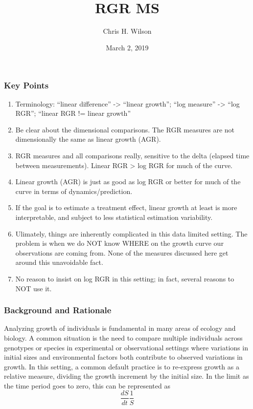 \documentclass[]{article}
\title{RGR MS}
\author{Chris H. Wilson}
\date{March 2, 2019}
\begin{document}
\maketitle

\subsubsection{Key Points}\label{key-points}

\begin{enumerate}
\def\labelenumi{\arabic{enumi})}
\item
  Terminology: ``linear difference'' -\textgreater{} ``linear growth'';
  ``log measure'' -\textgreater{} ``log RGR''; ``linear RGR != linear
  growth''
\item
  Be clear about the dimensional comparisons. The RGR measures are not
  dimensionally the same as linear growth (AGR).
\item
  RGR measures and all comparisons really, sensitive to the delta
  (elapsed time between measurements). Linear RGR \textgreater{} log RGR
  for much of the curve.
\item
  Linear growth (AGR) is just as good as log RGR or better for much of
  the curve in terms of dynamics/prediction.
\item
  If the goal is to estimate a treatment effect, linear growth at least
  is more interpretable, and subject to less statistical estimation
  variability.
\item
  Ulimately, things are inherently complicated in this data limited
  setting. The problem is when we do NOT know WHERE on the growth curve
  our observations are coming from. None of the measures discussed here
  get around this unavoidable fact.
\item
  No reason to insist on log RGR in this setting; in fact, several
  reasons to NOT use it.
\end{enumerate}

\subsubsection{Background and Rationale}\label{background-and-rationale}

Analyzing growth of individuals is fundamental in many areas of ecology
and biology. A common situation is the need to compare multiple
individuals across genotypes or species in experimental or observational
settings where variations in initial sizes and environmental factors
both contribute to observed variations in growth. In this setting, a
common default practice is to re-express growth as a relative measure,
dividing the growth increment by the initial size. In the limit as the
time period goes to zero, this can be represented as
\[\frac{dS}{dt}\frac{1}{S}\]
\end{document}
